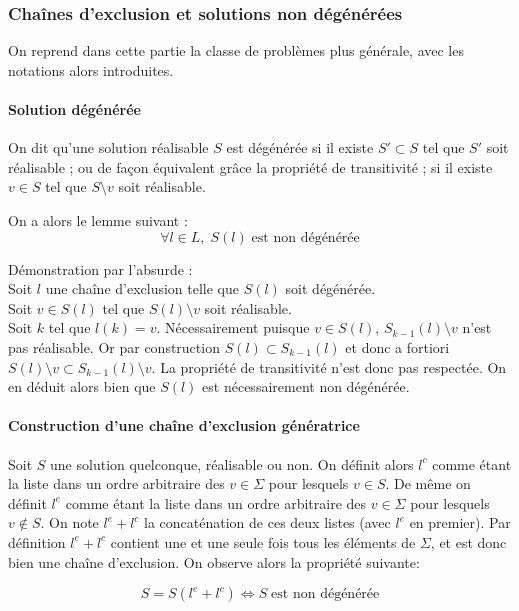 \documentclass[12pt,a4paper]{article}
\begin{document}
\subsubsection{Chaînes d'exclusion et solutions non dégénérées}

On reprend dans cette partie la classe de problèmes plus générale, avec les notations alors introduites.

 \paragraph{Solution dégénérée}
 
On dit qu'une solution réalisable $S$ est dégénérée si il existe $S'\subset S$ tel que $S'$ soit réalisable ; ou de façon équivalent grâce la propriété de transitivité ; si il existe $v\in S$ tel que $S\setminus v$ soit réalisable.

On a alors le lemme suivant :
\[\forall l\in L,\; S(l)\;\text{est non dégénérée}\]

Démonstration par l'absurde : 
\\Soit $l$ une chaîne d'exclusion telle que $S(l)$ soit dégénérée. 
\\Soit $v\in S(l)$ tel que $S(l)\setminus v$ soit réalisable.
\\Soit $k$ tel que $l(k)=v$.
Nécessairement puisque $v\in S(l)$, $S_{k-1}(l)\setminus v$ n'est pas réalisable. Or par construction $S(l)\subset S_{k-1}(l)$ et donc a fortiori $S(l)\setminus v \subset S_{k-1}(l)\setminus v$. La propriété de transitivité n'est donc pas respectée.
On en déduit alors bien que $S(l)$ est nécessairement non dégénérée.

\paragraph{Construction d'une chaîne d'exclusion génératrice}
Soit $S$ une solution quelconque, réalisable ou non. On définit alors $l^c$ comme étant la liste dans un ordre arbitraire des  $v\in \Sigma$ pour lesquels $v\in S$. De même on définit $l^e$ comme étant la liste dans un ordre arbitraire des $v\in \Sigma$ pour lesquels $v\notin S$. On note $l^e+l^c$ la concaténation de ces deux listes (avec $l^e$ en premier). Par définition $l^e+l^c$ contient une et une seule fois tous les éléments de $\Sigma$, et est donc bien une chaîne d'exclusion. On observe alors la propriété suivante:

\[S=S(l^e+l^c) \Leftrightarrow S\;\text{est non dégénérée}\]
\end{document}
